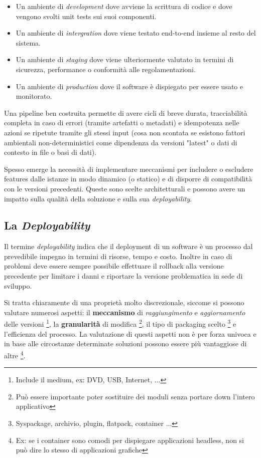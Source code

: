 \documentclass[a4paper,11pt,oneside, table]{article}
\begin{document}
  \begin{itemize}
    \item Un ambiente di \textit{development} dove avviene la scrittura di codice e dove vengono svolti unit tests sui suoi componenti.
    \item Un ambiente di \textit{intergration} dove viene testato end-to-end insieme al resto del sistema.
    \item Un ambiente di \textit{staging} dove viene ulteriormente valutato in termini di sicurezza, performance o conformit\`a alle regolamentazioni.
    \item Un ambiente di \textit{production} dove il software \`e dispiegato per essere usato e monitorato.
  \end{itemize}

  Una pipeline ben costruita permette di avere cicli di breve durata, tracciabilit\`a completa in caso di errori (tramite artefatti o metadati) e idempotenza nelle azioni se ripetute tramite gli stessi input (cosa non scontata se esistono fattori ambientali non-deterministici come dipendenza da versioni "latest" o dati di contesto in file o basi di dati).

  Spesso emerge la necessit\`a di implementare meccanismi per includere o escludere features dalle istanze in modo dinamico (o statico) e di disporre di compatibilit\`a con le versioni precedenti. Queste sono scelte architetturali e possono avere un impatto sulla qualit\`a della soluzione e sulla sua \textit{deployability}.

  \subsection{La \textit{Deployability}}

  Il termine \textit{deployability} indica che il deployment di un software \`e un processo dal prevedibile impegno in termini di risorse, tempo e costo. Inoltre in caso di problemi deve essere sempre possibile effettuare il rollback alla versione precedente per limitare i danni e riportare la versione problematica in sede di sviluppo.

  Si tratta chiaramente di una propriet\`a molto discrezionale, siccome si possono valutare numerosi aspetti: il \textbf{meccanismo} di \textit{raggiungimento} e \textit{aggiornamento} delle versioni \footnote{Include il medium, ex: DVD, USB, Internet, ...}, la \textbf{granularit\`a} di modifica \footnote{Pu\`o essere importante poter sostituire dei moduli senza portare down l'intero applicativo}, il tipo di packaging scelto \footnote{Syspackage, archivio, plugin, flatpack, container ...} e l'efficienza del processo. La valutazione di questi aspetti non \`e per forza univoca e in base alle circostanze determinate soluzioni possono essere pi\`u vantaggiose di altre \footnote{Ex: se i container sono comodi per dispiegare applicazioni headless, non si pu\`o dire lo stesso di applicazioni grafiche}.
\end{document}
